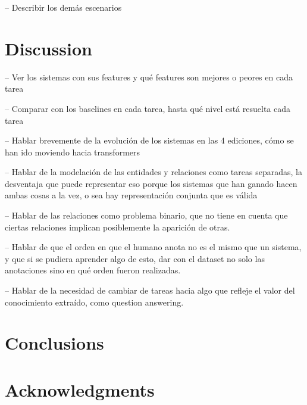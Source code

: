 \documentclass[a4paper,11pt,twocolumn,twoside]{article}
\begin{document}
-- Describir los demás escenarios

\section{Discussion}

-- Ver los sistemas con sus features y qué features son mejores o peores en cada tarea

-- Comparar con los baselines en cada tarea, hasta qué nivel está resuelta cada tarea

-- Hablar brevemente de la evolución de los sistemas en las 4 ediciones,
cómo se han ido moviendo hacia transformers

-- Hablar de la modelación de las entidades y relaciones como tareas separadas,
la desventaja que puede representar eso porque los sistemas que han ganado hacen
ambas cosas a la vez, o sea hay representación conjunta que es válida

-- Hablar de las relaciones como problema binario, que no tiene en cuenta que ciertas
relaciones implican posiblemente la aparición de otras.

-- Hablar de que el orden en que el humano anota no es el mismo que un sistema,
y que si se pudiera aprender algo de esto, dar con el dataset no solo las anotaciones
sino en qué orden fueron realizadas.

-- Hablar de la necesidad de cambiar de tareas hacia algo que refleje el valor
del conocimiento extraído, como question answering.

\section{Conclusions}

\section*{Acknowledgments}



\end{document}
